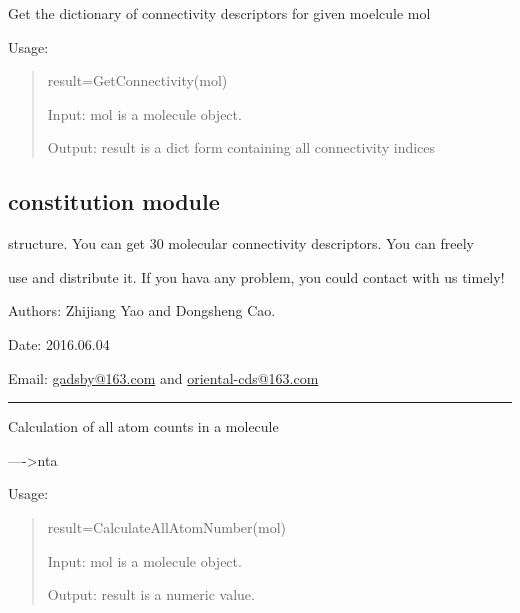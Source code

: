 \documentclass[letterpaper,10pt,english]{sphinxmanual}
\begin{document}

\begin{fulllineitems}
\label{reference/connectivity:connectivity.GetConnectivity}
Get the dictionary of connectivity descriptors for given moelcule mol

Usage:
\begin{quote}

result=GetConnectivity(mol)

Input: mol is a molecule object.

Output: result is a dict form containing all connectivity indices
\end{quote}

\end{fulllineitems}



\subsection{constitution module}
\label{reference/constitution:constitution-module}\label{reference/constitution:module-constitution}\label{reference/constitution::doc}
structure. You can get 30 molecular connectivity descriptors. You can freely

use and distribute it. If you hava  any problem, you could contact with us timely!

Authors: Zhijiang Yao and Dongsheng Cao.

Date: 2016.06.04

Email: \href{mailto:gadsby@163.com}{gadsby@163.com} and \href{mailto:oriental-cds@163.com}{oriental-cds@163.com}


\bigskip\hrule{}\bigskip


\begin{fulllineitems}
\label{reference/constitution:constitution.CalculateAllAtomNumber}
Calculation of all atom counts in a molecule

----\textgreater{}nta

Usage:
\begin{quote}

result=CalculateAllAtomNumber(mol)

Input: mol is a molecule object.

Output: result is a numeric value.
\end{quote}

\end{fulllineitems}
\end{document}
